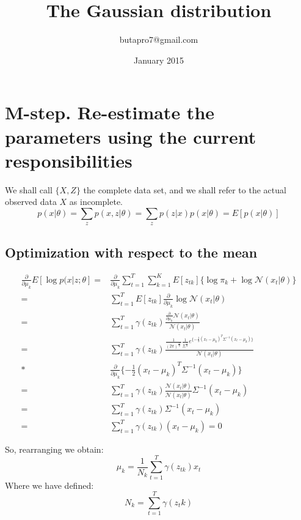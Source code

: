 \documentclass{article}
\title{The Gaussian distribution}
\author{butapro7@gmail.com }
\date{January 2015}
\begin{document}
\maketitle
\section{M-step. Re-estimate the parameters using the current responsibilities}

We shall call $\{{X,Z}\}$ the complete data set, and we shall refer to the actual observed data $X$ as incomplete.
\begin{equation}
p(x|\theta) = \sum\limits_{z} p(x, z|\theta) = \sum\limits_{z} p(z|x) p(x|\theta) = E[p(x|\theta)]
\end{equation}

\subsection{Optimization with respect to the mean}

\begin{equation}
    \begin{aligned}
\frac{\partial}{\partial \mu_k}E[\log p(x|z;\theta] = & 
\frac{\partial}{\partial \mu_k}\sum_{t=1}^T \sum_{k=1}^K
E[z_{tk}]\{\log \pi_k + \log \mathcal{N}(x_t|\theta)\} \\ = &
\sum_{t=1}^T E[z_{tk}] \frac{\partial}{\partial \mu_k} \log \mathcal{N}(x_t|\theta) \\ = & 
\sum_{t=1}^T \gamma(z_{tk}) 
\frac{\frac{\partial}{\partial \mu_k} \mathcal{N}(x_t|\theta)}
{\mathcal{N}(x_t|\theta)} \\ = &  
\sum_{t=1}^T \gamma(z_{tk}) 
\frac
{\frac{1}{(2\pi)^{\frac{D}{2}}} \frac{1}{\Sigma^{\frac{1}{2}}} e^{\{ -\frac{1}{2}(x_t-\mu_k)^T\Sigma^{-1}(x_t-\mu_k) \}}} 
{\mathcal{N}(x_t|\theta)} \\ \ast &
\frac{\partial}{\partial \mu_k} \{-\frac{1}{2}(x_t-\mu_k)^T\Sigma^{-1}(x_t-\mu_k) \} \\ = &
\sum_{t=1}^T \gamma(z_{tk}) 
\frac
{\mathcal{N}(x_t|\theta)}
{\mathcal{N}(x_t|\theta)}
\Sigma^{-1}(x_t-\mu_k) \\ = & 
\sum_{t=1}^T \gamma(z_{tk}) 
\Sigma^{-1}(x_t-\mu_k) \\ = &  
\sum_{t=1}^T \gamma(z_{tk}) 
(x_t-\mu_k) = 0
    \end{aligned}
\end{equation}

So, rearranging we obtain:
\begin{equation}
\mu_k = \frac{1}{N_k}\sum_{t=1}^T\gamma(z_{tk})x_t
\end{equation}
Where we have defined:
\begin{equation}
N_k = \sum_{t=1}^T\gamma(z_tk)
\end{equation}
\end{document}
